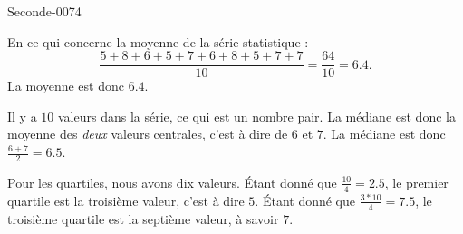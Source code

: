 
\begin{corrige}{Seconde-0074}

    En ce qui concerne la moyenne de la série statistique :
    \begin{equation}
        \frac{ 5+8+6+5+7+6+8+5+7+7 }{ 10 }=\frac{ 64 }{ 10 }=6.4.
    \end{equation}
    La moyenne est donc \( 6.4\).

    Il y a \( 10\) valeurs dans la série, ce qui est un nombre pair. La médiane est donc la moyenne des \emph{deux} valeurs centrales, c'est à dire de \( 6\) et \( 7\). La médiane est donc \( \frac{ 6+7 }{2}=6.5\).

    Pour les quartiles, nous avons dix valeurs. Étant donné que \( \frac{ 10 }{ 4 }=2.5\), le premier quartile est la troisième valeur, c'est à dire \( 5\). Étant donné que \( \frac{ 3*10 }{ 4 }=7.5\), le troisième quartile est la septième valeur, à savoir \( 7\).

\end{corrige}
